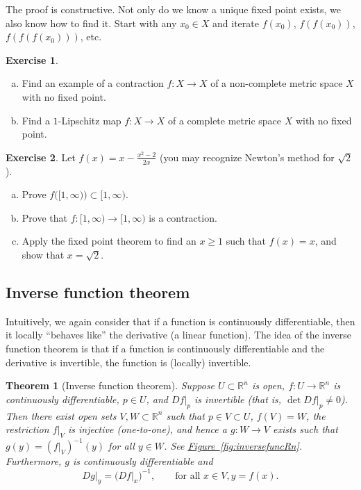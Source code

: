 \documentclass[12pt,openany]{book}
\newcommand{\R}{{\mathbb{R}}}
\newcommand{\myquote}[1]{``#1''}
\theoremstyle{plain}
\newtheorem{thm}{Theorem}[section]
\theoremstyle{remark}
\theoremstyle{definition}
\newenvironment{exbox}{%
    \def\FrameCommand{\vrule width 1pt \relax\hspace{10pt}}%
    \MakeFramed{\advance\hsize-\width\FrameRestore}%
}{%
    \endMakeFramed
}
\newenvironment{exparts}{%
    \leavevmode\begin{enumerate}[a),noitemsep,topsep=0pt,parsep=0pt,partopsep=0pt]
}{%
    \end{enumerate}
}
\theoremstyle{exercise}
\newtheorem{exercise}{Exercise}[section]
\theoremstyle{example}
\newcommand{\figureref}[1]{\hyperref[#1]{Figure~\ref*{#1}}}
\newcommand{\thmref}[1]{\hyperref[#1]{Theorem~\ref*{#1}}}
\begin{document}
The proof is constructive.  Not only do we know 
a unique fixed point exists, we also know how to find it.  Start with
any $x_0 \in X$ and iterate $f(x_0)$,
$f(f(x_0))$,
$f(f(f(x_0)))$, etc.

\begin{exbox}
\begin{exercise}
\begin{exparts}
\item
Find an example of a contraction $f \colon X \to X$
of a non-complete metric space $X$ with no
fixed point.
\item
Find a $1$-Lipschitz map $f \colon X \to X$ of a complete metric space $X$ with no fixed point.
\end{exparts}
\end{exercise}

\begin{exercise}
Let $f(x) = x-\frac{x^2-2}{2x}$ (you may recognize Newton's method for
$\sqrt{2}$).
\begin{exparts}
\item
Prove $f\bigl([1,\infty)\bigr) \subset [1,\infty)$.
\item
Prove that $f \colon [1,\infty) \to [1,\infty)$ is a contraction.
\item
Apply the fixed point theorem to find an $x \geq 1$ such that
$f(x) = x$, and show that $x = \sqrt{2}$.
\end{exparts}
\end{exercise}
\end{exbox}

\subsection{Inverse function theorem}
\label{subsec:svinvfuncthm}

Intuitively, we again consider that if a function is continuously differentiable, then it
locally \myquote{behaves like} the derivative (a linear function).
The idea of the inverse function theorem is that if a function is
continuously differentiable and the derivative is invertible, the function is
(locally) invertible.

\begin{thm}[Inverse function theorem]
\label{thm:inverse}
Suppose $U \subset \R^n$ is open, 
$f \colon U \to \R^n$ is continuously differentiable, $p \in U$, and $Df|_p$ is invertible
(that is, $\det Df|_p \neq 0$).
Then there exist open sets $V, W \subset \R^n$ such that
$p \in V \subset U$, $f(V) = W$, the restriction $f|_V$ is injective (one-to-one),
and hence a $g \colon W \to V$ exists such that
$g(y) = (f|_V)^{-1}(y)$ for all $y \in W$.
See \figureref{fig:inversefuncRn}.
Furthermore, $g$ is continuously differentiable
and 
\begin{equation*}
Dg|_y = {\bigl(Df|_x\bigr)}^{-1}, \qquad \text{for all } x \in V, y = f(x).
\end{equation*}
\end{thm}
\end{document}
